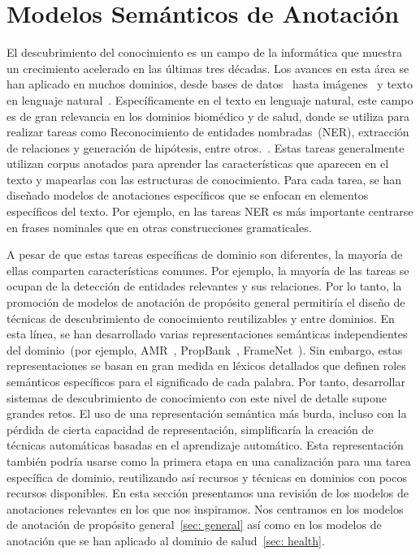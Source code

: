 \section{Modelos Semánticos de Anotación}

El descubrimiento del conocimiento es un campo de la informática que muestra un crecimiento acelerado en las últimas tres décadas.
Los avances en esta área se han aplicado en muchos dominios, desde bases de datos~\cite{fayyad1996data, knowledgeDatabase} hasta imágenes~\cite{lu2016visual} y texto en lenguaje natural~\cite{carlson2010toward}.
Específicamente en el texto en lenguaje natural, este campo es de gran relevancia en los dominios biomédico y de salud, donde se utiliza para realizar tareas como
Reconocimiento de entidades nombradas~(NER), extracción de relaciones y generación de hipótesis, entre otros.~\cite{simpson2012biomedical}.
Estas tareas generalmente utilizan corpus anotados para aprender las características que aparecen en el texto y mapearlas con las estructuras de conocimiento.
Para cada tarea, se han diseñado modelos de anotaciones específicos que se enfocan en elementos específicos del texto.
Por ejemplo, en las tareas NER es más importante centrarse en frases nominales que en otras construcciones gramaticales.

A pesar de que estas tareas específicas de dominio son diferentes, la mayoría de ellas comparten características comunes. Por ejemplo, la mayoría de las tareas se ocupan de la detección de entidades relevantes y sus relaciones. Por lo tanto, la promoción de modelos de anotación de propósito general permitiría el diseño de técnicas de descubrimiento de conocimiento reutilizables y entre dominios.
En esta línea, se han desarrollado varias representaciones semánticas independientes del dominio~(por ejemplo, AMR~\cite{amr}, PropBank~\cite{propbank}, FrameNet~\cite{framenet}).
Sin embargo, estas representaciones se basan en gran medida en léxicos detallados que definen roles semánticos específicos para el significado de cada palabra. Por tanto, desarrollar sistemas de descubrimiento de conocimiento con este nivel de detalle supone grandes retos. El uso de una representación semántica más burda, incluso con la pérdida de cierta capacidad de representación, simplificaría la creación de técnicas automáticas basadas en el aprendizaje automático.
Esta representación también podría usarse como la primera etapa en una canalización para una tarea específica de dominio, reutilizando así recursos y técnicas en dominios con pocos recursos disponibles.
En esta sección presentamos una revisión de los modelos de anotaciones relevantes en los que nos inspiramos.
Nos centramos en los modelos de anotación de propósito general~\ref{sec: general} así como en los modelos de anotación que se han aplicado al dominio de salud~\ref{sec: health}.

